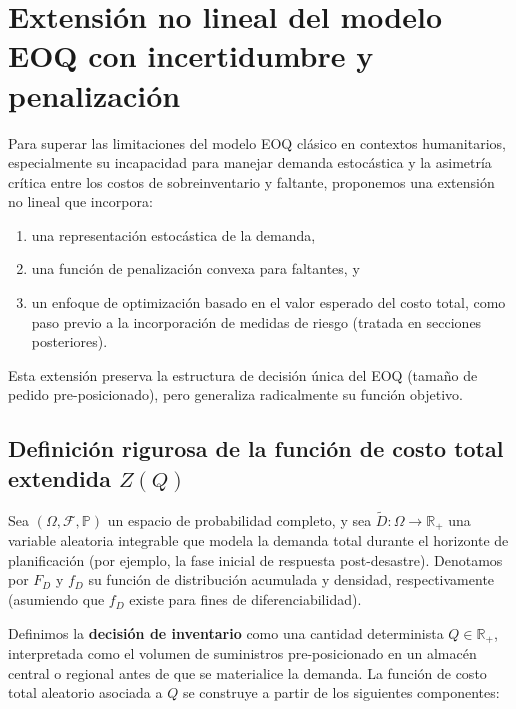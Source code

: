 \documentclass[
  spanish,
  us-letterpaper,
]{scrreprt}
\providecommand{\tightlist}{%
  \setlength{\itemsep}{0pt}\setlength{\parskip}{0pt}}
\numberwithin{equation}{section}
\begin{document}
\section{Extensión no lineal del modelo EOQ con incertidumbre y
penalización}\label{sec-extension}

Para superar las limitaciones del modelo EOQ clásico en contextos
humanitarios, especialmente su incapacidad para manejar demanda
estocástica y la asimetría crítica entre los costos de sobreinventario y
faltante, proponemos una extensión no lineal que incorpora:

\begin{enumerate}
\def\labelenumi{(\roman{enumi})}
\tightlist
\item
  una representación estocástica de la demanda,
\item
  una función de penalización convexa para faltantes, y
\item
  un enfoque de optimización basado en el valor esperado del costo
  total, como paso previo a la incorporación de medidas de riesgo
  (tratada en secciones posteriores).
\end{enumerate}

Esta extensión preserva la estructura de decisión única del EOQ (tamaño
de pedido pre-posicionado), pero generaliza radicalmente su función
objetivo.

\subsection{\texorpdfstring{Definición rigurosa de la función de costo
total extendida
\(Z(Q)\)}{Definición rigurosa de la función de costo total extendida Z(Q)}}\label{sec-definicionR}

Sea \((\Omega, \mathcal{F}, \mathbb{P})\) un espacio de probabilidad
completo, y sea \(\tilde{D}: \Omega \to \mathbb{R}_{+}\) una variable
aleatoria integrable que modela la demanda total durante el horizonte de
planificación (por ejemplo, la fase inicial de respuesta post-desastre).
Denotamos por \(F_D\) y \(f_D\) su función de distribución acumulada y
densidad, respectivamente (asumiendo que \(f_D\) existe para fines de
diferenciabilidad).

Definimos la \textbf{decisión de inventario} como una cantidad
determinista \(Q \in \mathbb{R}_{+}\), interpretada como el volumen de
suministros pre-posicionado en un almacén central o regional antes de
que se materialice la demanda. La función de costo total aleatorio
asociada a \(Q\) se construye a partir de los siguientes componentes:
\end{document}
